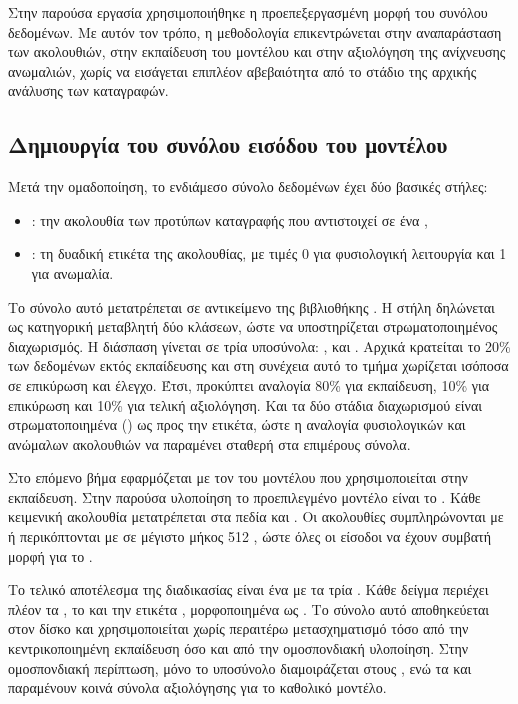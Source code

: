 Στην παρούσα εργασία χρησιμοποιήθηκε η προεπεξεργασμένη μορφή του συνόλου δεδομένων. Με αυτόν τον τρόπο, η μεθοδολογία επικεντρώνεται στην αναπαράσταση των ακολουθιών, στην εκπαίδευση του μοντέλου και στην αξιολόγηση της ανίχνευσης ανωμαλιών, χωρίς να εισάγεται επιπλέον αβεβαιότητα από το στάδιο της αρχικής ανάλυσης των καταγραφών.

\subsection{Δημιουργία του συνόλου εισόδου του μοντέλου}

Μετά την ομαδοποίηση, το ενδιάμεσο σύνολο δεδομένων έχει δύο βασικές στήλες:

\begin{itemize}
    \item {}: την ακολουθία των προτύπων καταγραφής που αντιστοιχεί σε ένα ,
    \item {}: τη δυαδική ετικέτα της ακολουθίας, με τιμές 0 για φυσιολογική λειτουργία και 1 για ανωμαλία.
\end{itemize}

Το σύνολο αυτό μετατρέπεται σε αντικείμενο  της βιβλιοθήκης . Η στήλη  δηλώνεται ως κατηγορική μεταβλητή δύο κλάσεων, ώστε να υποστηρίζεται στρωματοποιημένος διαχωρισμός. Η διάσπαση γίνεται σε τρία υποσύνολα: ,  και . Αρχικά κρατείται το 20\% των δεδομένων εκτός εκπαίδευσης και στη συνέχεια αυτό το τμήμα χωρίζεται ισόποσα σε επικύρωση και έλεγχο. Έτσι, προκύπτει αναλογία 80\% για εκπαίδευση, 10\% για επικύρωση και 10\% για τελική αξιολόγηση. Και τα δύο στάδια διαχωρισμού είναι στρωματοποιημένα () ως προς την ετικέτα, ώστε η αναλογία φυσιολογικών και ανώμαλων ακολουθιών να παραμένει σταθερή στα επιμέρους σύνολα.

Στο επόμενο βήμα εφαρμόζεται  με τον  του μοντέλου που χρησιμοποιείται στην εκπαίδευση. Στην παρούσα υλοποίηση το προεπιλεγμένο μοντέλο είναι το . Κάθε κειμενική ακολουθία μετατρέπεται στα πεδία  και . Οι ακολουθίες συμπληρώνονται με  ή περικόπτονται με  σε μέγιστο μήκος 512 , ώστε όλες οι είσοδοι να έχουν συμβατή μορφή για το .

Το τελικό αποτέλεσμα της διαδικασίας είναι ένα  με τα τρία . Κάθε δείγμα περιέχει πλέον τα , το  και την ετικέτα , μορφοποιημένα ως . Το σύνολο αυτό αποθηκεύεται στον δίσκο και χρησιμοποιείται χωρίς περαιτέρω μετασχηματισμό τόσο από την κεντρικοποιημένη εκπαίδευση όσο και από την ομοσπονδιακή υλοποίηση. Στην ομοσπονδιακή περίπτωση, μόνο το υποσύνολο  διαμοιράζεται στους , ενώ τα  και  παραμένουν κοινά σύνολα αξιολόγησης για το καθολικό μοντέλο.


